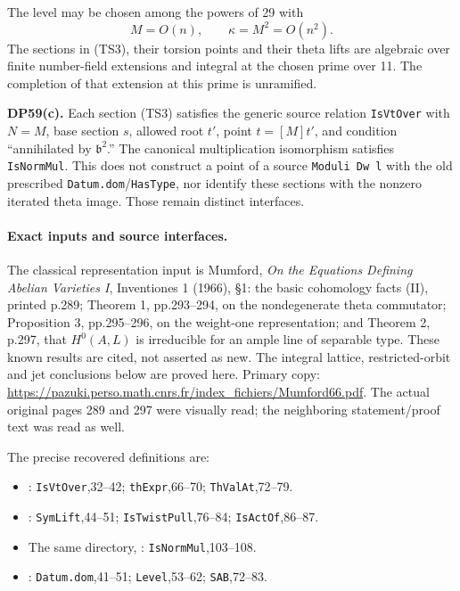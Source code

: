 \begin{theorem}
The level may be chosen among the powers of 29 with \[
 M=O(n),\qquad \kappa=M^2=O(n^2).
 \tag{TS6}
\] The sections in (TS3), their torsion points and their theta lifts are algebraic over finite number-field extensions and integral at the chosen prime over 11. The completion of that extension at this prime is unramified.

\textbf{DP59(c).} Each section (TS3) satisfies the generic source relation \texttt{IsVtOver} with \(N=M\), base section \(s\), allowed root \(t'\), point \(t=[M]t'\), and condition ``annihilated by \(\mathfrak b^2\).'' The canonical multiplication isomorphism satisfies \texttt{IsNormMul}. This does not construct a point of a source \texttt{Moduli\ Dw\ l} with the old prescribed \texttt{Datum.dom}/\texttt{HasType}, nor identify these sections with the nonzero iterated theta image. Those remain distinct interfaces.
\end{theorem}

\paragraph{Exact inputs and source interfaces.}
The classical representation input is Mumford, \emph{On the Equations Defining Abelian Varieties I}, Inventiones 1 (1966), §1: the basic cohomology facts (II), printed p.289; Theorem 1, pp.293--294, on the nondegenerate theta commutator; Proposition 3, pp.295--296, on the weight-one representation; and Theorem 2, p.297, that \(H^0(A,L)\) is irreducible for an ample line of separable type. These known results are cited, not asserted as new. The integral lattice, restricted-orbit and jet conclusions below are proved here. Primary copy: \url{https://pazuki.perso.math.cnrs.fr/index_fichiers/Mumford66.pdf}. The actual original pages 289 and 297 were visually read; the neighboring statement/proof text was read as well.

The precise recovered definitions are:

\begin{itemize}
\item
  : \texttt{IsVtOver},32--42; \texttt{thExpr},66--70; \texttt{ThValAt},72--79.
\item
  : \texttt{SymLift},44--51; \texttt{IsTwistPull},76--84; \texttt{IsActOf},86--87.
\item
  The same directory, : \texttt{IsNormMul},103--108.
\item
  : \texttt{Datum.dom},41--51; \texttt{Level},53--62; \texttt{SAB},72--83.
\end{itemize}

